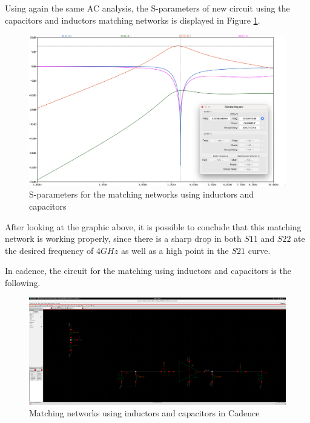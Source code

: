 Using again the same AC analysis, the S-parameters of new circuit using the capacitors and inductors matching networks is displayed in Figure \ref{fig:SIMLCMatching}.

\begin{figure}[H]
    \centering
    \includegraphics*[scale = 0.3]{Images/SIMLCmatching.png}
    \caption{S-parameters for the matching networks using inductors and capacitors}
    \label{fig:SIMLCMatching}
\end{figure}

After looking at the graphic above, it is possible to conclude that this matching network is working properly, since there is a sharp drop in both $S11$ and $S22$ ate the desired frequency of $4GHz$ as well as a high point in the $S21$ curve.

In cadence, the circuit for the matching using inductors and capacitors is the following.

\begin{figure}[H]
    \centering
    \includegraphics*[scale = 0.1]{Images/CadenceLCcircuit.png}
    \caption{Matching networks using inductors and capacitors in Cadence}
    \label{fig:CadenceLCcircuit}
\end{figure}

